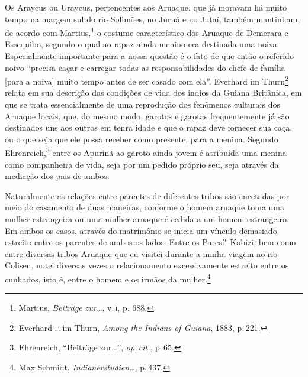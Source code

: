 Os Araycus ou Uraycus, pertencentes aos Aruaque, que já moravam há muito
tempo na margem sul do rio Solimões, no Juruá e no Jutaí, também
mantinham, de acordo com Martius,\footnote{Martius, \textit{Beiträge zur\ldots}, v.\,\textsc{i}, p.
  688.} o costume característico dos Aruaque de Demerara e Essequibo,
segundo o qual ao rapaz ainda menino era destinada uma noiva.
Especialmente importante para a nossa questão é o fato de que então o
referido noivo ``precisa caçar e carregar todas as responsabilidades do
chefe de família {[}para a noiva{]} muito tempo antes de ser casado com
ela''. Everhard im Thurn\footnote{Everhard \textsc{f}.\,im Thurn, \textit{Among the
  Indians of Guiana}, 1883, p.\,221.} relata em sua descrição das
condições de vida dos índios da Guiana Britânica, em que se trata
essencialmente de uma reprodução dos fenômenos culturais dos Aruaque
locais, que, do mesmo modo, garotos e garotas frequentemente já são
destinados uns aos outros em tenra idade e que o rapaz deve fornecer sua
caça, ou o que seja que ele possa receber como presente, para a menina.
Segundo Ehrenreich,\footnote{Ehrenreich, ``Beiträge zur\ldots'', \textit{op.\,cit.}, p.\,65.} entre os Apurinã ao garoto
ainda jovem é atribuída uma menina como companheira de vida, seja por um
pedido próprio seu, seja através da mediação dos pais de ambos.

Naturalmente as relações entre parentes de diferentes tribos são
encetadas por meio do casamento de duas maneiras, conforme o homem
aruaque toma uma mulher estrangeira ou uma mulher aruaque é cedida a um
homem estrangeiro. Em ambos os casos, através do matrimônio se inicia um
vínculo demasiado estreito entre os parentes de ambos os lados. Entre
os Paresí"-Kabizi, bem como entre diversas tribos Aruaque que eu visitei
durante a minha viagem ao rio Coliseu, notei diversas vezes o
relacionamento excessivamente estreito entre os cunhados, isto é, entre
o homem e os irmãos da mulher.\footnote{Max Schmidt,
  \textit{Indianerstudien\ldots}, p.\,437.}


